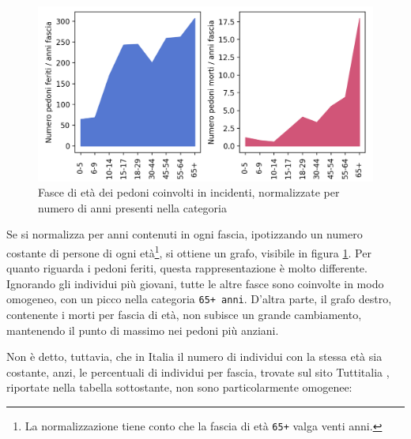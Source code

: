 \documentclass[a4paper,12pt]{report}
\newcommand{\columnstyle}[1]{\texttt{#1}}
\begin{document}
\begin{figure}
    \includegraphics[width=\linewidth]{../src/incidenti/incidenti_senza_coords/pedoni/eta_pedoni.png}
    \caption{Fasce di età dei pedoni coinvolti in incidenti, normalizzate per numero di anni 
    presenti nella categoria}
    \label{fig:eta-pedoni}
\end{figure}

Se si normalizza per anni contenuti in ogni fascia, ipotizzando un numero 
costante di persone di ogni età\footnote{La normalizzazione tiene conto 
che la fascia di età \columnstyle{65+} valga venti anni.}, 
si ottiene un grafo, visibile in figura \ref{fig:eta-pedoni}. 
Per quanto riguarda i pedoni feriti, questa rappresentazione è molto differente.
Ignorando gli individui più giovani, tutte le altre fasce sono coinvolte 
in modo omogeneo, con un picco nella categoria \columnstyle{65+ anni}.
D'altra parte, il grafo destro, contenente i morti per fascia di età, 
non subisce un grande cambiamento, mantenendo il punto di massimo nei 
pedoni più anziani.

Non è detto, tuttavia, che in Italia il numero di individui con 
la stessa età sia costante, anzi, le percentuali di individui per fascia, 
trovate sul sito Tuttitalia \cite{TUTTITALIA:1}, riportate nella tabella 
sottostante, non sono particolarmente omogenee: 
\end{document}
